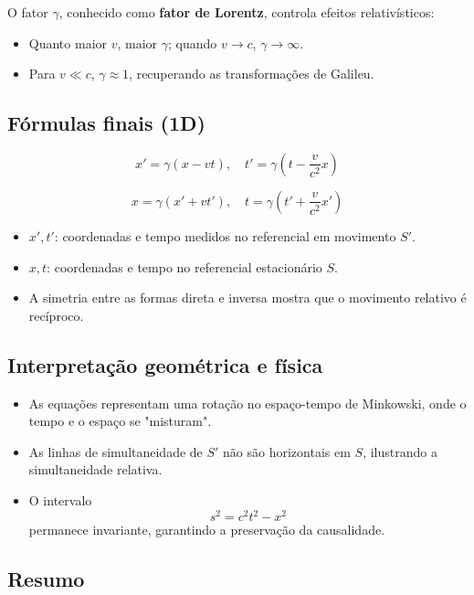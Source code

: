 \documentclass[12pt,a4paper]{article}
\begin{document}
O fator $\gamma$, conhecido como \textbf{fator de Lorentz}, controla efeitos relativísticos:

\begin{itemize}
    \item Quanto maior $v$, maior $\gamma$; quando $v \to c$, $\gamma \to \infty$.
    \item Para $v \ll c$, $\gamma \approx 1$, recuperando as transformações de Galileu.
\end{itemize}

\subsection{Fórmulas finais (1D)}

\[
x' = \gamma (x - v t), \quad t' = \gamma \left(t - \frac{v}{c^2} x \right)
\]

\[
x = \gamma (x' + v t'), \quad t = \gamma \left(t' + \frac{v}{c^2} x' \right)
\]

\begin{itemize}
    \item $x', t'$: coordenadas e tempo medidos no referencial em movimento $S'$.
    \item $x, t$: coordenadas e tempo no referencial estacionário $S$.
    \item A simetria entre as formas direta e inversa mostra que o movimento relativo é recíproco.
\end{itemize}

\subsection{Interpretação geométrica e física}

\begin{itemize}
    \item As equações representam uma rotação no espaço-tempo de Minkowski, onde o tempo e o espaço se "misturam".
    \item As linhas de simultaneidade de $S'$ não são horizontais em $S$, ilustrando a simultaneidade relativa.
    \item O intervalo 
    \[
    s^2 = c^2 t^2 - x^2
    \] 
    permanece invariante, garantindo a preservação da causalidade.
\end{itemize}

\subsection{Resumo}
\end{document}
